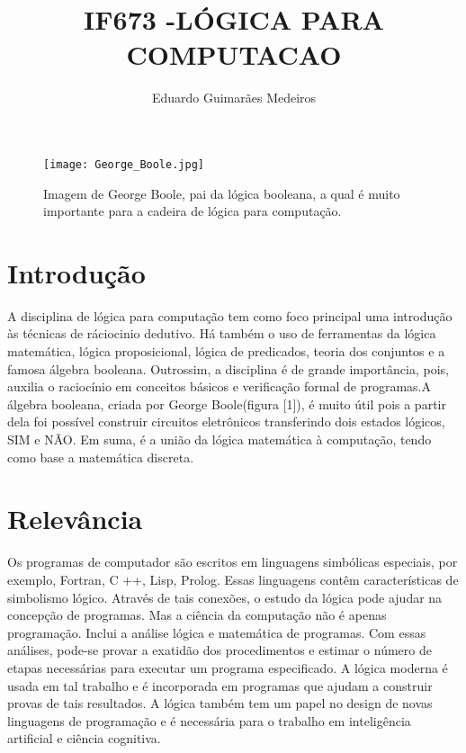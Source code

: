 \documentclass[a4paper]{article}
\title{IF673 -LÓGICA PARA COMPUTACAO}
\author{Eduardo Guimarães Medeiros}
\begin{document}
\maketitle
\begin{figure}[h]
\centering
\texttt{[image: George\_Boole.jpg]}
\caption{\label{fig:George_Boole} Imagem de George Boole, pai da lógica booleana, a qual é muito importante para a cadeira de lógica para computação.}
\begin{comment}
Link da imagem junto a licença:
https://commons.wikimedia.org/wiki/File:George_Boole.jpg ----- Imagem de Boole.8
Licença:
Public Domain.
\end{comment}

\end{figure}
\section{Introdução}
A disciplina de lógica para computação tem como foco principal uma introdução às técnicas de ráciocinio dedutivo. Há também o uso de ferramentas da lógica matemática, lógica proposicional, lógica de predicados, teoria dos conjuntos e a famosa álgebra booleana\cite{1}\cite{Language}. Outrossim, a disciplina é de grande importância, pois, auxilia o raciocínio em conceitos básicos e verificação formal de programas.A álgebra booleana, criada por George Boole(figura [1]), é muito útil pois a partir dela foi possível construir circuitos eletrônicos transferindo dois estados lógicos, SIM e NÃO.  Em suma, é a união da lógica matemática à computação, tendo como base a matemática discreta. 

\section{Relevância}
Os programas de computador são escritos em linguagens simbólicas especiais, por exemplo, Fortran, C ++, Lisp, Prolog. Essas linguagens contêm características de simbolismo lógico. Através de tais conexões, o estudo da lógica pode ajudar na concepção de programas. Mas a ciência da computação não é apenas programação. Inclui a análise lógica e matemática de programas\cite{Model}. Com essas análises, pode-se provar a exatidão dos procedimentos e estimar o número de etapas necessárias para executar um programa especificado. A lógica moderna é usada em tal trabalho e é incorporada em programas que ajudam a construir provas de tais resultados. A lógica também tem um papel no design de novas linguagens de programação e é necessária para o trabalho em inteligência artificial e ciência cognitiva. 
\end{document}
